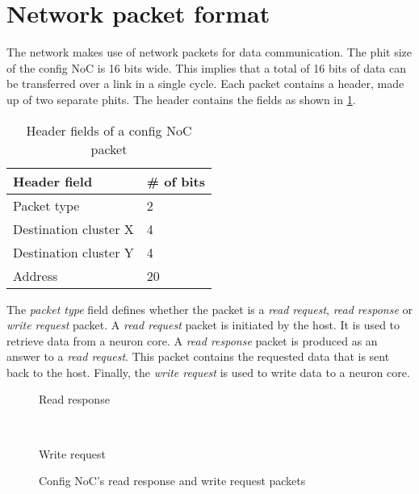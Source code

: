 \section{Network packet format}
The network makes use of network packets for data communication.
The phit size of the config NoC is 16 bits wide.
This implies that a total of 16 bits of data can be transferred over a link in a single cycle.
Each packet contains a header, made up of two separate phits.
The header contains the fields as shown in \cref{tab:header_fields}.

\begin{table}[hbtp]
\centering
\begin{tabular}{@{}ll@{}}
\toprule
\textbf{Header field} & \textbf{\# of bits} \\ \midrule
Packet type           & 2                   \\
Destination cluster X & 4                   \\
Destination cluster Y & 4                   \\
Address               & 20                  \\ \bottomrule
\end{tabular}
\caption{Header fields of a config NoC packet}
\label{tab:header_fields}
\end{table}

The \textit{packet type} field defines whether the packet is a \textit{read request}, \textit{read response} or \textit{write request} packet.
A \textit{read request} packet is initiated by the host.
It is used to retrieve data from a neuron core.
A \textit{read response} packet is produced as an answer to a \textit{read request}.
This packet contains the requested data that is sent back to the host.
Finally, the \textit{write request} is used to write data to a neuron core.

\hspace*{0.5em}
\begin{figure}[hbtp]
    \centering
    \begin{subcaptionblock}{\linewidth}
        \centering
        \begin{adjustbox}{width=0.7\linewidth}
            
        \end{adjustbox}
        \caption{Read response}
        \label{fig:read_response_packet}
    \end{subcaptionblock}
    \\ \vspace{1.5em}
    \begin{subcaptionblock}{\linewidth}
        \centering
        \begin{adjustbox}{width=0.7\linewidth}
            
        \end{adjustbox}
        \caption{Write request}
        \label{fig:write_request_packet}
    \end{subcaptionblock}
    \caption{Config NoC's read response and write request packets}
\end{figure}

